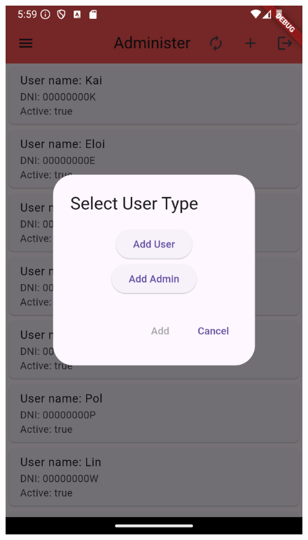 \documentclass[a4paper,12pt,twoside]{ThesisStyle}
\begin{document}
\begin{figure}[h]
\begin{minipage}{0.31\textwidth}
        \includegraphics[width=\linewidth]{imatges/adminadd1.png}

\end{minipage}
\end{figure}
\end{document}
